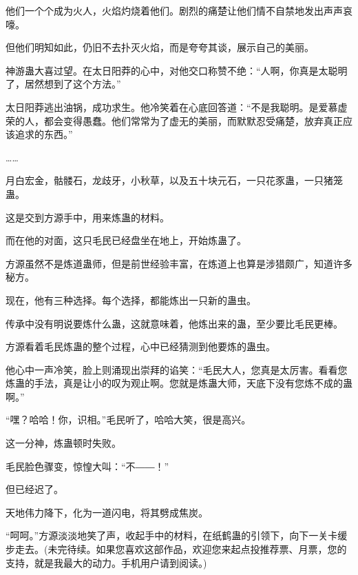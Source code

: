 \begin{this_body}
他们一个个成为火人，火焰灼烧着他们。剧烈的痛楚让他们情不自禁地发出声声哀嚎。

但他们明知如此，仍旧不去扑灭火焰，而是夸夸其谈，展示自己的美丽。

神游蛊大喜过望。在太日阳莽的心中，对他交口称赞不绝：“人啊，你真是太聪明了，居然想到了这个方法。”

太日阳莽逃出油锅，成功求生。他冷笑着在心底回答道：“不是我聪明。是爱慕虚荣的人，都会变得愚蠢。他们常常为了虚无的美丽，而默默忍受痛楚，放弃真正应该追求的东西。”

……

月白宏金，骷髅石，龙歧牙，小秋草，以及五十块元石，一只花豕蛊，一只猪笼蛊。

这是交到方源手中，用来炼蛊的材料。

而在他的对面，这只毛民已经盘坐在地上，开始炼蛊了。

方源虽然不是炼道蛊师，但是前世经验丰富，在炼道上也算是涉猎颇广，知道许多秘方。

现在，他有三种选择。每个选择，都能炼出一只新的蛊虫。

传承中没有明说要炼什么蛊，这就意味着，他炼出来的蛊，至少要比毛民更棒。

方源看着毛民炼蛊的整个过程，心中已经猜测到他要炼的蛊虫。

他心中一声冷笑，脸上则涌现出崇拜的谄笑：“毛民大人，您真是太厉害。看看您炼蛊的手法，真是让小的叹为观止啊。您就是炼蛊大师，天底下没有您炼不成的蛊啊。”

“嘿？哈哈！你，识相。”毛民听了，哈哈大笑，很是高兴。

这一分神，炼蛊顿时失败。

毛民脸色骤变，惊惶大叫：“不――！”

但已经迟了。

天地伟力降下，化为一道闪电，将其劈成焦炭。

“呵呵。”方源淡淡地笑了声，收起手中的材料，在纸鹤蛊的引领下，向下一关卡缓步走去。(未完待续。如果您喜欢这部作品，欢迎您来起点投推荐票、月票，您的支持，就是我最大的动力。手机用户请到阅读。)

\end{this_body}

